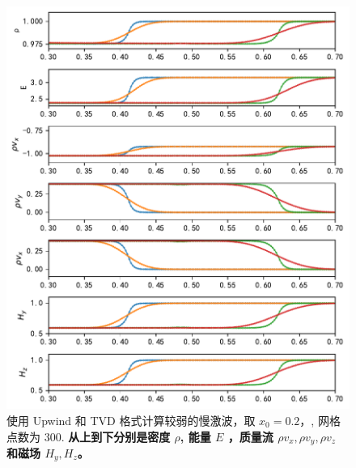 \documentclass[10.5pt
]{article}
\begin{document}
\begin{figure}[htpb]
	\centering
	\includegraphics{figures/case3_fast_upwind_TVD.pdf}
	\caption{使用 Upwind 和 TVD 格式计算较弱的慢激波，取 \(x_0 = 0.2，\), 网格点数为 300. \textbf{从上到下分别是密度 $\rho$, 能量 $E$ ，质量流 $\rho v_x, \rho v_y, \rho v_z$ 和磁场 $H_y, H_z$。}
	}%
	\label{fig:upwind_tvd_2}
\end{figure}
\end{document}
